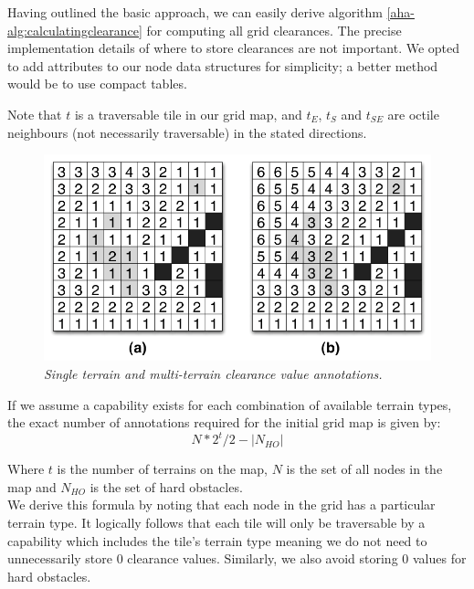 Having outlined the basic approach, we can easily derive algorithm \ref{aha-alg:calculatingclearance} for computing all grid clearances. The precise implementation details of where to store clearances are not important. We opted to add attributes to our node data structures for simplicity; a better method would be to use compact tables.



Note that $t$ is a traversable tile in our grid map, and $t_{E}$, $t_{S}$ and $t_{SE}$ are octile neighbours (not necessarily traversable) in the stated directions.

\begin{figure}[htbp]
        \caption{\emph{Single terrain and multi-terrain clearance value annotations.} }
        \begin{center}
                        \includegraphics[scale=0.25]{diagrams/annotations.png}
        \end{center}
        \label{aha-fig:annotations}
\end{figure}

If we assume a capability exists for each combination of available terrain types, the exact number of annotations required for the initial grid map is given by:
\begin{equation}
N*2^t/2 - |N_{HO}|
\label{aha-eq:gridannotations}
\end{equation}

Where $t$ is the number of terrains on the map, $N$ is the set of all nodes in the map and $N_{HO}$ is the set of hard obstacles. \\ \newline
We derive this formula by noting that each node in the grid has a particular terrain type. It logically follows that each tile will only be traversable by a capability which includes the tile's terrain type meaning we do not need to unnecessarily store 0 clearance values. Similarly, we also avoid storing 0 values for hard obstacles.

